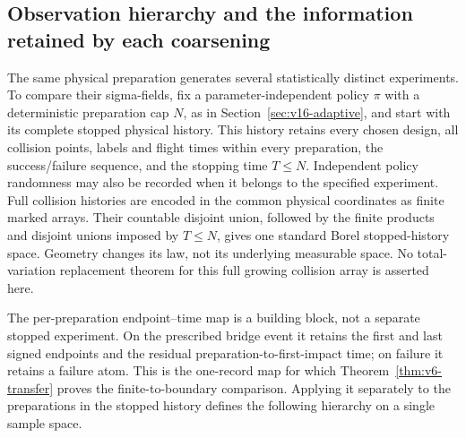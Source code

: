 \subsection{Observation hierarchy and the information retained by each coarsening}
\label{subsec:v23-observation-hierarchy}

The same physical preparation generates several statistically distinct
experiments.  To compare their sigma-fields, fix a parameter-independent
policy \(\pi\) with a deterministic preparation cap \(N\), as in
Section~\ref{sec:v16-adaptive}, and start with its complete stopped physical
history.  This history retains every chosen design, all collision points,
labels and flight times within every preparation, the success/failure
sequence, and the stopping time \(T\le N\).  Independent policy randomness
may also be recorded when it belongs to the specified experiment.  Full
collision histories are encoded in the common physical coordinates as
finite marked arrays.  Their countable disjoint union, followed by the
finite products and disjoint unions imposed by \(T\le N\), gives one
standard Borel stopped-history space.  Geometry changes its law, not its
underlying measurable space.  No total-variation replacement theorem for
this full growing collision array is asserted here.

The per-preparation endpoint--time map is a building block, not a separate
stopped experiment.  On the prescribed bridge event it retains the first
and last signed endpoints and the residual preparation-to-first-impact
time; on failure it retains a failure atom.  This is the one-record map for
which Theorem~\ref{thm:v6-transfer} proves the finite-to-boundary comparison.
Applying it separately to the preparations in the stopped history defines
the following hierarchy on a single sample space.

